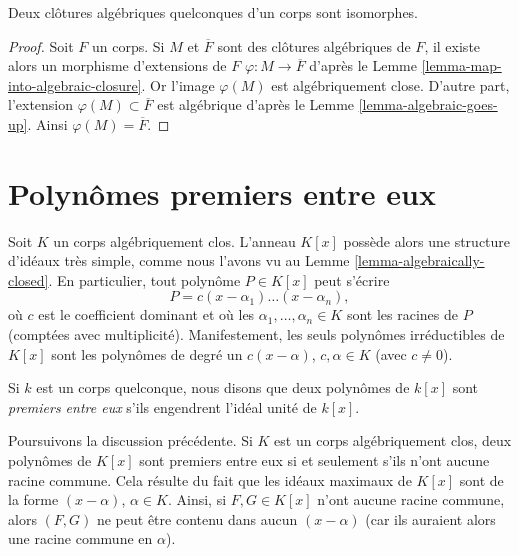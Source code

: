 \begin{lemma}
\label{lemma-algebraic-closures-isomorphic}
Deux clôtures algébriques quelconques d'un corps sont isomorphes.
\end{lemma}

\begin{proof}
Soit $F$ un corps. Si $M$ et $\overline{F}$ sont des clôtures algébriques de
$F$, il existe alors un morphisme d'extensions de $F$
$\varphi : M \to \overline{F}$ d'après le
Lemme \ref{lemma-map-into-algebraic-closure}.
Or l'image $\varphi(M)$ est algébriquement close.
D'autre part, l'extension $\varphi(M) \subset \overline{F}$
est algébrique d'après le Lemme \ref{lemma-algebraic-goes-up}.
Ainsi $\varphi(M) = \overline{F}$.
\end{proof}





\section{Polynômes premiers entre eux}
\label{section-relatively-prime}

\noindent
Soit $K$ un corps algébriquement clos. L'anneau $K[x]$ possède alors une structure
d'idéaux très simple, comme nous l'avons vu au Lemme \ref{lemma-algebraically-closed}.
En particulier, tout polynôme $P \in K[x]$ peut s'écrire
$$
P = c(x - \alpha_1) \ldots (x - \alpha_n),
$$
où $c$ est le coefficient dominant et où les $\alpha_1, \ldots, \alpha_n \in K$
sont les racines de $P$ (comptées avec multiplicité). Manifestement, les seuls polynômes
irréductibles de $K[x]$ sont les polynômes de degré un $c(x - \alpha)$,
$c, \alpha \in K$ (avec $c \neq 0$).

\begin{definition}
\label{definition-relatively-prime}
Si $k$ est un corps quelconque, nous disons que deux polynômes de $k[x]$ sont
{\it premiers entre eux} s'ils engendrent l'idéal unité de $k[x]$.
\end{definition}

\noindent
Poursuivons la discussion précédente. Si $K$ est un corps algébriquement clos,
deux polynômes de $K[x]$ sont premiers entre eux si et seulement s'ils n'ont aucune
racine commune. Cela résulte du fait que les idéaux maximaux de $K[x]$ sont de la forme
$(x - \alpha)$, $\alpha \in K$. Ainsi, si $F, G \in K[x]$ n'ont aucune racine commune,
alors $(F, G)$ ne peut être contenu dans aucun $(x - \alpha)$ (car ils auraient alors
une racine commune en $\alpha$).

